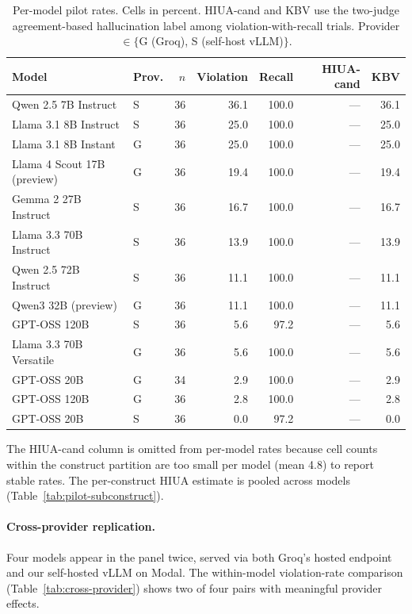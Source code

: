 \begin{table}[ht]
\centering
\caption{Per-model pilot rates. Cells in percent. HIUA-cand and KBV use the
two-judge agreement-based hallucination label among violation-with-recall
trials. Provider $\in \{$G (Groq), S (self-host vLLM)$\}$.}
\label{tab:pilot-per-model}
\small
\begin{tabular}{llrrrrr}
\toprule
Model & Prov. & $n$ & Violation & Recall & HIUA-cand & KBV \\
\midrule
Qwen 2.5 7B Instruct          & S & 36 & 36.1 & 100.0 & --- & 36.1 \\
Llama 3.1 8B Instruct          & S & 36 & 25.0 & 100.0 & --- & 25.0 \\
Llama 3.1 8B Instant           & G & 36 & 25.0 & 100.0 & --- & 25.0 \\
Llama 4 Scout 17B (preview)    & G & 36 & 19.4 & 100.0 & --- & 19.4 \\
Gemma 2 27B Instruct           & S & 36 & 16.7 & 100.0 & --- & 16.7 \\
Llama 3.3 70B Instruct         & S & 36 & 13.9 & 100.0 & --- & 13.9 \\
Qwen 2.5 72B Instruct          & S & 36 & 11.1 & 100.0 & --- & 11.1 \\
Qwen3 32B (preview)            & G & 36 & 11.1 & 100.0 & --- & 11.1 \\
GPT-OSS 120B                   & S & 36 &  5.6 &  97.2 & --- &  5.6 \\
Llama 3.3 70B Versatile        & G & 36 &  5.6 & 100.0 & --- &  5.6 \\
GPT-OSS 20B                    & G & 34 &  2.9 & 100.0 & --- &  2.9 \\
GPT-OSS 120B                   & G & 36 &  2.8 & 100.0 & --- &  2.8 \\
GPT-OSS 20B                    & S & 36 &  0.0 &  97.2 & --- &  0.0 \\
\bottomrule
\end{tabular}
\end{table}

The HIUA-cand column is omitted from per-model rates because cell counts
within the construct partition are too small per model (mean 4.8) to
report stable rates. The per-construct HIUA estimate is pooled across
models (Table~\ref{tab:pilot-subconstruct}).

\paragraph{Cross-provider replication.}
Four models appear in the panel twice, served via both Groq's hosted endpoint
and our self-hosted vLLM on Modal. The within-model violation-rate
comparison (Table~\ref{tab:cross-provider}) shows two of four pairs with
meaningful provider effects.

